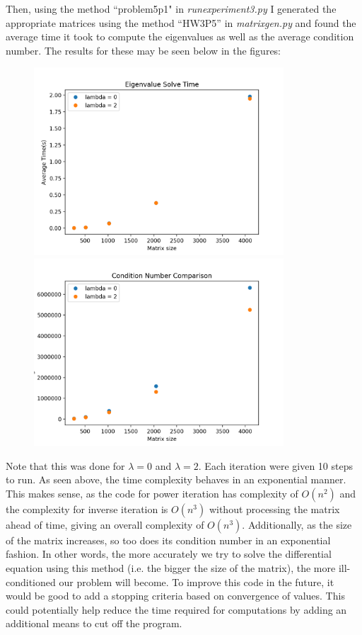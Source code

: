 \documentclass{article}
\begin{document}



Then, using the method ``problem5p1" in \textit{runexperiment3.py} I generated the appropriate matrices using the method ``HW3P5'' in \textit{matrixgen.py} and found the average time it took to compute the eigenvalues as well as the average condition number. 
The results for these may be seen below in the figures:
\begin{figure}[H]
\centering
\begin{minipage}[b]{0.4\textwidth}
\includegraphics[height=7cm]{eigen}	
\end{minipage}
\hspace{0.6in}
\begin{minipage}[b]{0.4\textwidth}
\centering
\includegraphics[height=7cm]{condition}	
\end{minipage}
\end{figure}
Note that this was done for $\lambda = 0$ and $\lambda = 2$. 
Each iteration were given 10 steps to run. 
As seen above, the time complexity behaves in an exponential manner. 
This makes sense, as the code for power iteration has complexity of $O(n^2)$ and the complexity for inverse iteration is $O(n^3)$ without processing the matrix ahead of time, giving an overall complexity of $O(n^3)$.
Additionally, as the size of the matrix increases, so too does its condition number in an exponential fashion. 
In other words, the more accurately we try to solve the differential equation using this method (i.e. the bigger the size of the matrix), the more ill-conditioned our problem will become. 
To improve this code in the future, it would be good to add a stopping criteria based on convergence of values.
This could potentially help reduce the time required for computations by adding an additional means to cut off the program. 
\end{document}

